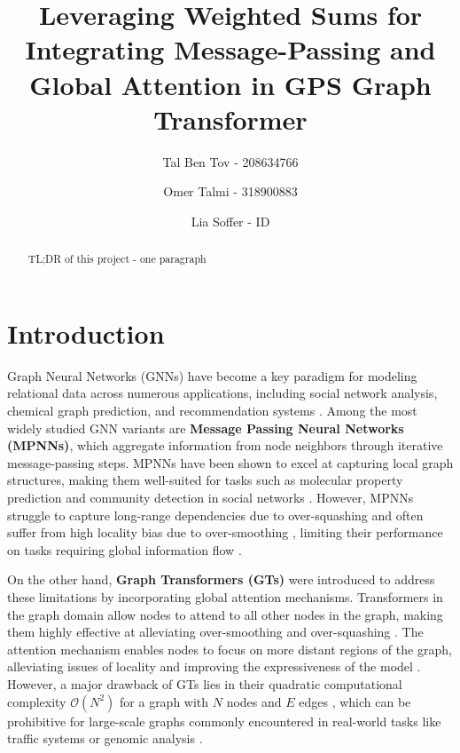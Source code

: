 \documentclass{acmart}
\title{Leveraging Weighted Sums for Integrating Message-Passing and Global Attention in GPS Graph Transformer}
\author{Tal Ben Tov - 208634766}
\author{Omer Talmi - 318900883}
\author{Lia Soffer - ID}
\date{}
\begin{document}
\begin{abstract}
TL;DR of this project - one paragraph
\end{abstract}
\maketitle
{}

\section{Introduction}

Graph Neural Networks (GNNs) have become a key paradigm for modeling relational data across numerous applications, including social network analysis, chemical graph prediction, and recommendation systems \cite{gilmer2017neuralmessagepassingquantum}. Among the most widely studied GNN variants are \textbf{Message Passing Neural Networks (MPNNs)}, which aggregate information from node neighbors through iterative message-passing steps. MPNNs have been shown to excel at capturing local graph structures, making them well-suited for tasks such as molecular property prediction and community detection in social networks \cite{gilmer2017neuralmessagepassingquantum}. However, MPNNs struggle to capture long-range dependencies due to over-squashing \cite{alon2021bottleneckgraphneuralnetworks} and often suffer from high locality bias due to over-smoothing \cite{oono2021graphneuralnetworksexponentially}, limiting their performance on tasks requiring global information flow \cite{dwivedi2022benchmarkinggraphneuralnetworks}.


On the other hand, \textbf{Graph Transformers (GTs)} were introduced to address these limitations by incorporating global attention mechanisms. Transformers in the graph domain allow nodes to attend to all other nodes in the graph, making them highly effective at alleviating over-smoothing and over-squashing \cite{alon2021bottleneckgraphneuralnetworks, topping2022understandingoversquashingbottlenecksgraphs}. The attention mechanism enables nodes to focus on more distant regions of the graph, alleviating issues of locality and improving the expressiveness of the model \cite{xu2019powerfulgraphneuralnetworks, morris2021weisfeilerlemanneuralhigherorder}. However, a major drawback of GTs lies in their quadratic computational complexity $\mathcal{O}(N^2)$ for a graph with $N$ nodes and $E$ edges \cite{vaswani2023attentionneed}, which can be prohibitive for large-scale graphs commonly encountered in real-world tasks like traffic systems or genomic analysis \cite{dwivedi2022benchmarkinggraphneuralnetworks}.
\end{document}
